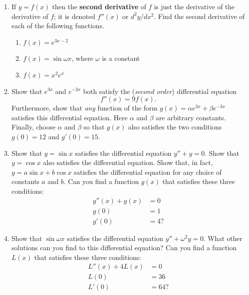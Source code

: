 \begin{enumerate}
\item If $y = f(x)$ then the {\bf second derivative} of $f$ is just the derivative of the derivative of $f$;
it is denoted $f''(x)$ or $d^2y/dx^2$.  Find the second derivative of
each of the following functions.

  \begin{enumerate}
  \item $f(x) = e^{3x-2}$


  \item $f(x) = \sin{\omega x}$, where $\omega$ is a constant


  \item $f(x) = x^2e^x$


\end{enumerate}
\item Show that $e^{3x}$ and $e^{-3x}$ both satisfy the ({\em second
  order\/}) differential equation
	\[
f''(x) = 9 f(x).
\]
Furthermore, show that {\em any\/} function of the form $g(x) = \alpha e^{3x} + \beta e^{-3x}$ satisfies this differential equation.  Here $\alpha$ and $\beta$ are arbitrary constants.  Finally, choose $\alpha$ and $\beta$ so that $g(x)$ also satisfies the two conditions $g(0) = 12$ and $g'(0) = 15$.


\item Show that $y = \sin{x}$ satisfies the differential equation $y''
+ y = 0$.  Show that $y = \cos{x}$ also satisfies the differential
equation.  Show that, in fact, $y=a \sin{x} + b \cos{x}$ satisfies the
differential equation for any choice of constants $a$ and $b$.  Can
you find a function $g(x)$ that satisfies these three conditions:
\begin{align*}
	g''(x) + g(x) & =  0 \\
		g(0)  & =  1 \\
		g'(0) & =  4 ?
\end{align*}


\item Show that $\sin{\omega x}$ satisfies the differential equation
$y'' + {\omega}^2 y = 0$.  What other solutions can you find to this
differential equation?  Can you find a function $L(x)$ that satisfies
these three conditions:
\begin{align*}
L''(x) + 4L(x) & =  0 \\
	L(0)   & =  36 \\
	L'(0)  & =  64 ?
\end{align*}


\end{enumerate}
